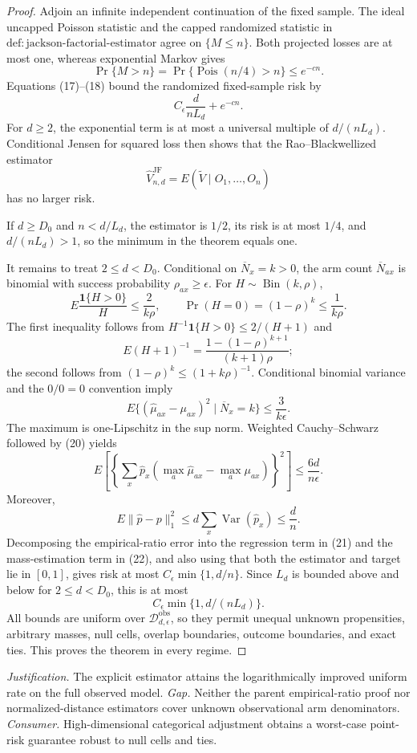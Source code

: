 \documentclass{article}
\begin{document}
\begin{proof}
Adjoin an infinite independent continuation of the fixed sample.  The ideal uncapped Poisson statistic and the capped randomized statistic in \(\mathrm{def:jackson\mbox{-}factorial\mbox{-}estimator}\) agree on \(\{M\leq n\}\).  Both projected losses are at most one, whereas exponential Markov gives
\[
 \Pr\{M>n\}=\Pr\{\operatorname{Pois}(n/4)>n\}\leq e^{-cn}.       \tag{18}
\]
Equations (17)--(18) bound the randomized fixed-sample risk by
\[
 C_\epsilon\frac d{nL_d}+e^{-cn}.
\]
For \(d\geq2\), the exponential term is at most a universal multiple of \(d/(nL_d)\).  Conditional Jensen for squared loss then shows that the Rao--Blackwellized estimator
\[
 \widehat V_{n,d}^{\mathrm{JF}}=E(\widetilde V\mid O_1,\ldots,O_n)
\]
has no larger risk.

If \(d\geq D_0\) and \(n<d/L_d\), the estimator is \(1/2\), its risk is at most \(1/4\), and \(d/(nL_d)>1\), so the minimum in the theorem equals one.

It remains to treat \(2\leq d<D_0\).  Conditional on \(\overline N_x=k>0\), the arm count \(\overline N_{ax}\) is binomial with success probability \(\rho_{ax}\geq\epsilon\).  For \(H\sim\operatorname{Bin}(k,\rho)\),
\[
 E\frac{\mathbf1\{H>0\}}H\leq\frac2{k\rho},
 \qquad
 \Pr(H=0)=(1-\rho)^k\leq\frac1{k\rho}.                            \tag{19}
\]
The first inequality follows from \(H^{-1}\mathbf1\{H>0\}\leq2/(H+1)\) and
\[
 E(H+1)^{-1}=\frac{1-(1-\rho)^{k+1}}{(k+1)\rho};
\]
the second follows from \((1-\rho)^k\leq(1+k\rho)^{-1}\).  Conditional binomial variance and the \(0/0=0\) convention imply
\[
 E\{(\widehat\mu_{ax}-\mu_{ax})^2\mid\overline N_x=k\}
 \leq\frac3{k\epsilon}.                                            \tag{20}
\]
The maximum is one-Lipschitz in the sup norm.  Weighted Cauchy--Schwarz followed by (20) yields
\[
 E\left[
 \left\{\sum_x\widehat p_x
 (\max_a\widehat\mu_{ax}-\max_a\mu_{ax})\right\}^2\right]
 \leq\frac{6d}{n\epsilon}.                                         \tag{21}
\]
Moreover,
\[
 E\lVert\widehat p-p\rVert_1^2
 \leq d\sum_x\operatorname{Var}(\widehat p_x)\leq\frac dn.       \tag{22}
\]
Decomposing the empirical-ratio error into the regression term in (21) and the mass-estimation term in (22), and also using that both the estimator and target lie in \([0,1]\), gives risk at most \(C_\epsilon\min\{1,d/n\}\).  Since \(L_d\) is bounded above and below for \(2\leq d<D_0\), this is at most
\[
 C_\epsilon\min\{1,d/(nL_d)\}.
\]
All bounds are uniform over \(\mathcal D_{d,\epsilon}^{\mathrm{obs}}\), so they permit unequal unknown propensities, arbitrary masses, null cells, overlap boundaries, outcome boundaries, and exact ties.  This proves the theorem in every regime.
\end{proof}
\par\smallskip\noindent \textit{Justification.} The explicit estimator attains the logarithmically improved uniform rate on the full observed model. \textit{Gap.} Neither the parent empirical-ratio proof nor normalized-distance estimators cover unknown observational arm denominators. \textit{Consumer.} High-dimensional categorical adjustment obtains a worst-case point-risk guarantee robust to null cells and ties.
\end{document}
